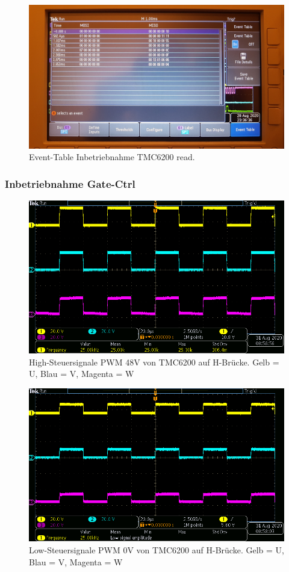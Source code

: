 \begin{figure}[H]
\center
\includegraphics[width = \textwidth]{graphics/TMC6200_EventTable_Lesen_Bild}
\caption{Event-Table Inbetriebnahme TMC6200 read.}
\label{fig:TMC6200_EventTable_Lesen_Bild}
\end{figure}

\subsubsection{Inbetriebnahme Gate-Ctrl}\label{Appendix:TMC6200_Gate_Ctrl}

\begin{figure}[H]
\center
\includegraphics[width = \textwidth]{graphics/TMC6200_Gate_Signal_H}
\caption{High-Steuersignale PWM 48V von TMC6200 auf H-Brücke. Gelb = U, Blau = V, Magenta = W}
\label{fig:TMC6200_Gate_Signal_H}
\end{figure}

\begin{figure}[H]
\center
\includegraphics[width = \textwidth]{graphics/TMC6200_Gate_Signal_L}
\caption{Low-Steuersignale PWM 0V von TMC6200 auf H-Brücke. Gelb = U, Blau = V, Magenta = W}
\label{fig:TMC6200_Gate_Signal_L}
\end{figure}